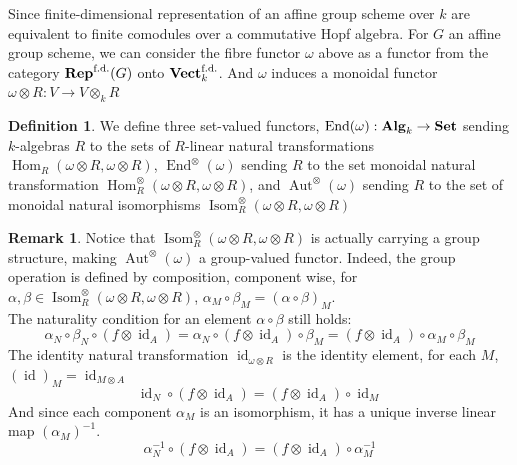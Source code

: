 \documentclass{article}
\theoremstyle{plain}
\theoremstyle{definition}
\newtheorem{definition}[theorem]{Definition}
\newtheorem{remark}{Remark}
\DeclareMathOperator{\Hom}{Hom}
\DeclareMathOperator{\Isom}{Isom}
\DeclareMathOperator{\Aut}{Aut}
\DeclareMathOperator{\End}{End}
\DeclareMathOperator{\id}{id}
\DeclareMathOperator{\SET}{\bf{Set}}
\DeclareMathOperator{\Alg}{\bf{Alg}}
\DeclareMathOperator{\Vect}{\bf{Vect}}
\DeclareMathOperator{\Rep}{\bf{Rep}}
\begin{document}
\noindent Since finite-dimensional representation of an affine group scheme over $k$ are equivalent to finite comodules over a commutative Hopf algebra.
For $G$ an affine group scheme, we can consider the fibre functor $\omega$ above as a functor from the category $\Rep^{\text{f.d.}}(G)$ onto $\Vect^{\text{f.d.}}_k$.
And $\omega$ induces a monoidal functor $\omega\otimes R :  V\rightarrow V\otimes_k R$
\begin{definition}
\label{automorphism_fibre_functor}
    We define three set-valued functors, 
    $\End(\omega): \Alg_k\rightarrow \SET$ sending $k$-algebras $R$ to the sets of $R$-linear natural transformations $\Hom_R(\omega\otimes R,\omega\otimes R)$,
    $\End^{\otimes}(\omega)$ sending $R$ to the set monoidal natural transformation $\Hom^{\otimes}_R(\omega\otimes R,\omega\otimes R)$, 
    and $\Aut^{\otimes}(\omega)$ sending $R$ to the set of monoidal natural isomorphisms $\Isom^{\otimes}_R(\omega\otimes R,\omega\otimes R)$
\end{definition}

\begin{remark}
    Notice that $\Isom^{\otimes}_R(\omega\otimes R,\omega\otimes R)$ is actually carrying a group structure, making $\Aut^{\otimes}(\omega)$ a group-valued functor.
    Indeed, the group operation is defined by composition, component wise,
    for $\alpha,\beta \in \Isom_R^{\otimes}(\omega\otimes R,\omega\otimes R)$, $\alpha_M\circ\beta_M = (\alpha\circ\beta)_M$.\\
    The naturality condition for an element $\alpha\circ\beta$ still holds:
    $$\alpha_N\circ\beta_N\circ(f\otimes\id_A) = \alpha_N\circ(f\otimes \id_A)\circ\beta_M= (f\otimes\id_A)\circ\alpha_M\circ\beta_M$$
    The identity natural transformation $\id_{\omega\otimes R}$ is the identity element, for each $M$, $(\id)_M = \id_{M\otimes A}$
    $$\id_N\circ(f\otimes\id_A) = (f\otimes\id_A)\circ\id_M$$
    And since each component $\alpha_M$ is an isomorphism, it has a unique inverse linear map $(\alpha_M)^{-1}$.
    $$\alpha_N^{-1}\circ(f\otimes\id_A) = (f\otimes \id_A)\circ \alpha_M^{-1}$$
\end{remark}
\end{document}
